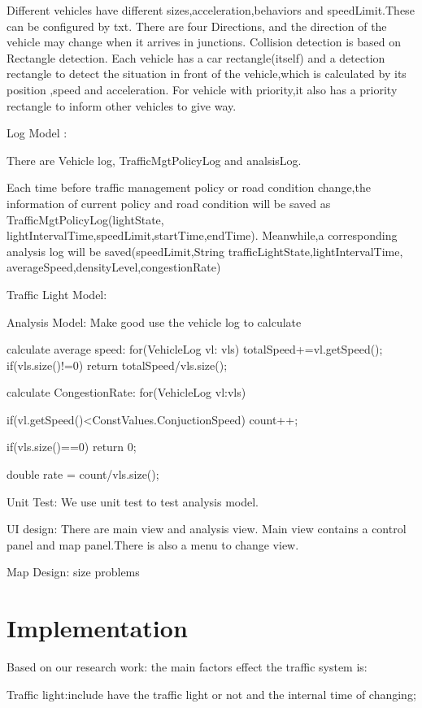 \documentclass[12pt]{amsart}
\begin{document}
Different vehicles have different sizes,acceleration,behaviors and speedLimit.These can be configured by txt.
There are four Directions, and the direction of the vehicle may change when it arrives in junctions.
Collision detection is based on Rectangle detection. Each vehicle has a car rectangle(itself) and a detection rectangle to detect the situation in front of the vehicle,which is calculated by its position ,speed and  acceleration.
For vehicle with priority,it also has a priority rectangle to inform other vehicles to give way.
 
Log Model :
 
There are Vehicle log, TrafficMgtPolicyLog and analsisLog.

Each time before traffic management policy or road condition change,the information of current policy and road condition will be saved as TrafficMgtPolicyLog(lightState, lightIntervalTime,speedLimit,startTime,endTime). 
Meanwhile,a corresponding analysis log will be saved(speedLimit,String trafficLightState,lightIntervalTime, averageSpeed,densityLevel,congestionRate) 

Traffic Light Model:

Analysis Model:
Make good use the vehicle log to calculate

 calculate average speed: 
	for(VehicleLog vl: vls){
			totalSpeed+=vl.getSpeed();
		}		
		if(vls.size()!=0){
			return totalSpeed/vls.size();
		}

calculate CongestionRate:
for(VehicleLog vl:vls){
            if(vl.getSpeed()<ConstValues.ConjuctionSpeed){
            	count++;
            }
            
		}
				
	if(vls.size()==0)
		return 0;	
	
	double  rate = count/vls.size();


Unit Test:
We use unit test to test analysis model.

UI design:
There are main view and  analysis view. Main view contains a control panel and map panel.There is also a menu to change view.

Map Design:
size problems

\section{Implementation}

Based on our research work: the main factors effect the traffic system is:

Traffic light:include have the traffic light or not and the internal time of changing;
\end{document}
